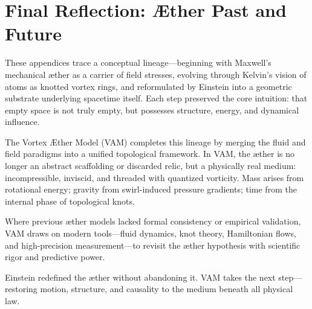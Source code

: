 \documentclass[preprint,notitlepage]{revtex4-2}
\begin{document}
\begin{center}
\end{center}


\section*{Final Reflection: Æther Past and Future}

    These appendices trace a conceptual lineage—beginning with Maxwell's mechanical æther as a carrier of field stresses, evolving through Kelvin's vision of atoms as knotted vortex rings, and reformulated by Einstein into a geometric substrate underlying spacetime itself. Each step preserved the core intuition: that empty space is not truly empty, but possesses structure, energy, and dynamical influence.

    The Vortex Æther Model (VAM) completes this lineage by merging the fluid and field paradigms into a unified topological framework. In VAM, the æther is no longer an abstract scaffolding or discarded relic, but a physically real medium: incompressible, inviscid, and threaded with quantized vorticity. Mass arises from rotational energy; gravity from swirl-induced pressure gradients; time from the internal phase of topological knots.

    Where previous æther models lacked formal consistency or empirical validation, VAM draws on modern tools—fluid dynamics, knot theory, Hamiltonian flows, and high-precision measurement—to revisit the æther hypothesis with scientific rigor and predictive power.

    Einstein redefined the æther without abandoning it. VAM takes the next step—restoring motion, structure, and causality to the medium beneath all physical law.



    
    
\end{document}
